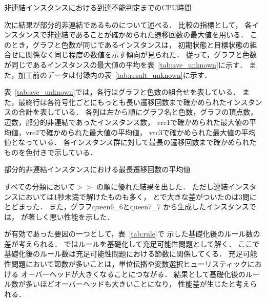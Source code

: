 \begin{table}[htbp]
  \centering
  \caption{非連結インスタンスにおける到達不能判定までのCPU時間}
  
  \label{tab:result_uncon}
\end{table}

次に結果が部分的非連結であるものについて述べる．
比較の指標として，
各インスタンスで非連結であることが確かめられた遷移回数の最大値を用いる．
このとき，グラフと色数が同じであるインスタンスは，
初期状態と目標状態の組合せに関係なく同じ程度の数値を示す傾向が見られた．
従って，グラフと色数が同じであるインスタンスの最大値の平均を表~\ref{tab:ave_unknown}に示す．
また，加工前のデータは付録内の表~\ref{tab:result_unknown}に示す．

表~\ref{tab:ave_unknown}では，各行はグラフと色数の組合せを表している．
また，最終行は各符号化ごとにもっとも長い遷移回数まで確かめられたインスタンスの合計を表している．
各列は左から順にグラフ名と色数，グラフの頂点数，辺数，部分的非連結であったインスタンス数，
vrc1で確かめられた最大値の平均値，vrc2で確かめられた最大値の平均値，
vrc3で確かめられた最大値の平均値となっている．
各インスタンス群に対して最長の遷移回数まで確かめられたものを色付きで示している．

\begin{table}[htbp]
  \centering
  \caption{部分的非連結インスタンスにおける最長遷移回数の平均値}
  
  \label{tab:ave_unknown}
\end{table}

すべての分類において$>$$>$
の順に優れた結果を出した．
ただし連結インスタンスにおいては1秒未満で解けたものも多く，
とで大きな差がついたのは3問にとどまった．
また，グラフqueen6\_6とqueen7\_7
から生成したインスタンスでは，
が著しく悪い性能を示した．

が有効であった要因の一つとして，表~\ref{tab:rule}で
示した基礎化後のルール数の差が考えられる．
{\clingo}ではルールを基礎化して充足可能性問題として解く．
ここで基礎化後のルール数は充足可能性問題における節数に関係してくる．
充足可能性問題において節数が多いことは，単位伝播や変数選択ヒューリスティックにおける
オーバーヘッドが大きくなることにつながる．
結果として基礎化後のルール数が多いほどオーバーヘッドも大きいことになり，
性能差が生じたと考えられる．

%

